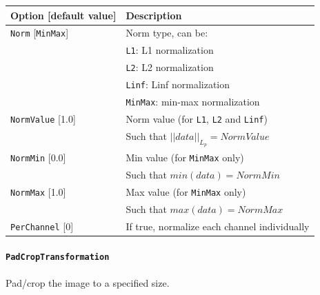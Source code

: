 \documentclass[a4paper,11pt,oneside]{article}
\begin{document}
\begin{center}
 \begin{tabular}{| p{5cm} | p{10cm} | }
 \hline
 Option [default value] & Description\\
 \hline\hline
  \lstinline!Norm! [\lstinline!MinMax!] & Norm type, can be: \\
   & \lstinline!L1!: L1 normalization \\
   & \lstinline!L2!: L2 normalization \\
   & \lstinline!Linf!: Linf normalization \\
   & \lstinline!MinMax!: min-max normalization \\
  \lstinline!NormValue! [1.0] & Norm value (for \lstinline!L1!, \lstinline!L2!
   and \lstinline!Linf!) \\
   & Such that $||data||_{L_{p}} = NormValue$ \\
  \lstinline!NormMin! [0.0] & Min value (for \lstinline!MinMax! only) \\
   & Such that $min(data) = NormMin$ \\
  \lstinline!NormMax! [1.0] & Max value (for \lstinline!MinMax! only) \\
   & Such that $max(data) = NormMax$ \\
  \lstinline!PerChannel! [0] & If true, normalize each channel individually \\
 \hline
\end{tabular}
\end{center}


\paragraph{\texorpdfstring{%
\lstinline[basicstyle=\ttfamily\bfseries]!PadCropTransformation!}
{PadCropTransformation}}
Pad/crop the image to a specified size.
\end{document}
